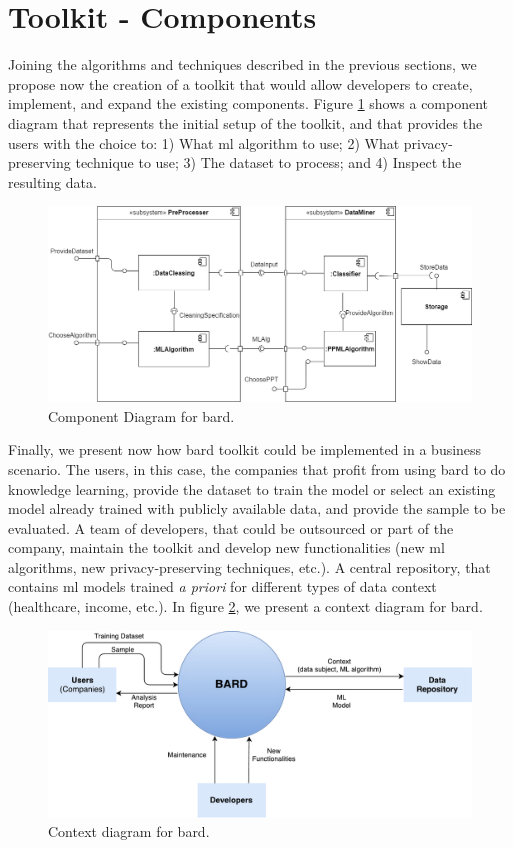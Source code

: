 
\section{Toolkit - Components}
\label{sec:components}

Joining the algorithms and techniques described in the previous sections, we propose now the creation of a toolkit that would allow developers to create, implement, and expand the existing components. Figure \ref{fig:compdiag} shows a component diagram that represents the initial setup of the toolkit, and that provides the users with the choice to: 1) What \ac{ml} algorithm to use; 2) What privacy-preserving technique to use; 3) The dataset to process; and 4) Inspect the resulting data.

\begin{figure}[H]
  \centerline{\includegraphics[width=1.1\textwidth]{images/CompDiagram.png}}
  \caption{Component Diagram for \acs{bard}.}
  \label{fig:compdiag}
\end{figure} 


Finally, we present now how \acs{bard} toolkit could be implemented in a business scenario. The users, in this case, the companies that profit from using \acs{bard} to do knowledge learning, provide the dataset to train the model or select an existing model already trained with publicly available data, and provide the sample to be evaluated. A team of developers, that could be outsourced or part of the company, maintain the toolkit and develop new functionalities (new \ac{ml} algorithms, new privacy-preserving techniques, etc.). A central repository, that contains \ac{ml} models trained \textit{a priori} for different types of data context (healthcare, income, etc.). In figure \ref{fig:contextdiag}, we present a context diagram for \acs{bard}.


\begin{figure}[H]
  \centerline{\includegraphics[width=1.1\textwidth]{images/ContextBard.pdf}}
  \caption{Context diagram for \acs{bard}.}
  \label{fig:contextdiag}
\end{figure} 